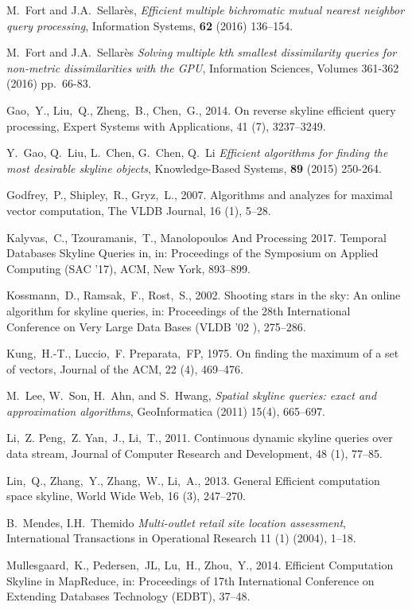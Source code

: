 \documentclass[11pt,onecolumn]{elsart3p}
\begin{document}
\begin{thebibliography}{100}
M.~Fort and J.A.~Sellar\`es, \emph{Efficient multiple bichromatic mutual nearest neighbor query processing}, Information Systems, \textbf{62} (2016) 136--154.


M.~Fort and J.A.~Sellar\`es
\emph{Solving multiple kth smallest dissimilarity queries for non-metric dissimilarities with the GPU},
Information Sciences, Volumes 361-362 (2016) pp.~66-83.

 Gao,~Y., Liu,~Q., Zheng,~B., Chen,~G., 2014. On reverse skyline efficient query processing, Expert Systems with Applications, 41 (7), 3237--3249.

Y.~Gao, Q.~Liu, L.~Chen, G.~Chen, Q.~Li
\emph{Efficient algorithms for finding the most desirable skyline objects}, Knowledge-Based Systems, \textbf{89} (2015) 250-264.


 Godfrey,~P., Shipley,~R., Gryz,~L., 2007. Algorithms and analyzes for maximal vector computation, The VLDB Journal, 16 (1), 5--28.

 Kalyvas,~C., Tzouramanis,~T., Manolopoulos And Processing 2017. Temporal Databases Skyline
Queries in, in: Proceedings of the Symposium on Applied Computing (SAC '17), ACM, New York, 893--899.

 Kossmann,~D., Ramsak,~F., Rost,~S., 2002. Shooting stars in the sky: An online algorithm
for skyline queries, in: Proceedings of the 28th International Conference on Very Large Data Bases (VLDB '02 ), 275--286.

 Kung,~H.-T., Luccio,~F. Preparata,~FP, 1975. On finding the maximum of a set of vectors, Journal of the ACM, 22 (4), 469--476.

M.~Lee, W.~Son, H.~Ahn, and S.~Hwang, \emph{Spatial skyline queries: exact and
approximation algorithms}, GeoInformatica (2011) 15(4), 665--697.

 Li,~Z. Peng,~Z. Yan,~J., Li,~T., 2011. Continuous dynamic skyline queries over data
stream, Journal of Computer Research and Development, 48 (1), 77--85.

 Lin,~Q., Zhang,~Y., Zhang,~W., Li,~A., 2013. General Efficient computation space skyline,
World Wide Web, 16 (3), 247--270.

B.~Mendes, I.H.~Themido
\emph{Multi-outlet retail site location assessment},
International Transactions in Operational Research 11 (1) (2004), 1--18.

 Mullesgaard,~K., Pedersen,~JL, Lu,~H., Zhou,~Y., 2014. Efficient Computation Skyline in
MapReduce, in: Proceedings of 17th International Conference on Extending Databases Technology (EDBT), 37--48.


\end{thebibliography}
\end{document}
